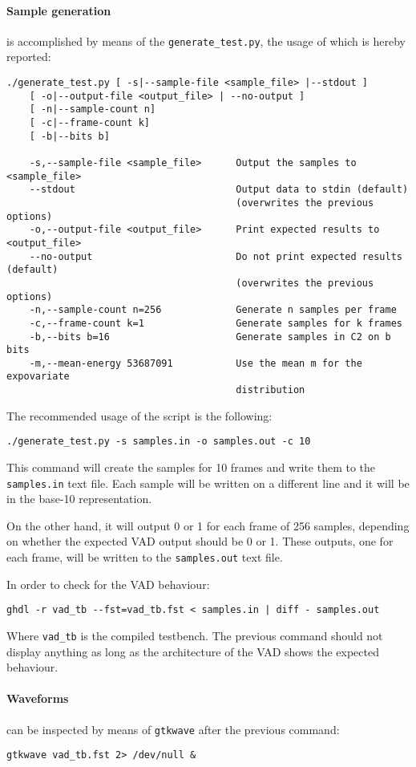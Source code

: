 \paragraph{Sample generation} is accomplished by means of the
\texttt{generate\_test.py}, the usage of which is hereby reported:
\footnotesize{
\begin{verbatim}
./generate_test.py [ -s|--sample-file <sample_file> |--stdout ]
    [ -o|--output-file <output_file> | --no-output ]
    [ -n|--sample-count n]
    [ -c|--frame-count k]
    [ -b|--bits b]

    -s,--sample-file <sample_file>      Output the samples to <sample_file>
    --stdout                            Output data to stdin (default)
                                        (overwrites the previous options)
    -o,--output-file <output_file>      Print expected results to <output_file>
    --no-output                         Do not print expected results (default)
                                        (overwrites the previous options)
    -n,--sample-count n=256             Generate n samples per frame
    -c,--frame-count k=1                Generate samples for k frames
    -b,--bits b=16                      Generate samples in C2 on b bits
    -m,--mean-energy 53687091           Use the mean m for the expovariate
                                        distribution
\end{verbatim}
}

The recommended usage of the script is the following:
\begin{verbatim}
./generate_test.py -s samples.in -o samples.out -c 10
\end{verbatim}
This command will create the samples for 10 frames and write them to the
\texttt{samples.in} text file. Each sample will be written on a different line
and it will be in the base-10 representation.

On the other hand, it will output 0 or 1 for each frame of 256 samples, depending
on whether the expected VAD output should be 0 or 1. These outputs, one for each
frame, will be written to the \texttt{samples.out} text file.

In order to check for the VAD behaviour:
\begin{verbatim}
ghdl -r vad_tb --fst=vad_tb.fst < samples.in | diff - samples.out
\end{verbatim}
Where \texttt{vad\_tb} is the compiled testbench. The previous command should not
display anything as long as the architecture of the VAD shows the expected
behaviour.

\paragraph{Waveforms} can be inspected by means of \texttt{gtkwave} after
the previous command:
\begin{verbatim}
gtkwave vad_tb.fst 2> /dev/null &
\end{verbatim}

